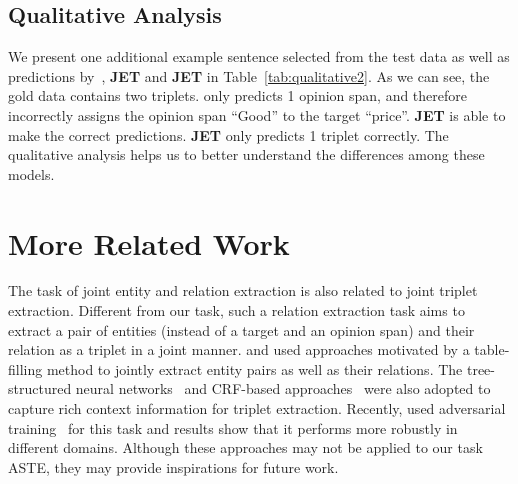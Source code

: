 \documentclass[11pt,a4paper]{article}
\begin{document}
\subsection{Qualitative Analysis}

We present one additional example sentence selected from the test data as well as predictions by~\citet{peng2019knowing}, \textbf{JET} and \textbf{JET} in Table~\ref{tab:qualitative2}.
As we can see, the gold data contains two triplets.
\citet{peng2019knowing} only predicts 1 opinion span, and therefore incorrectly assigns the opinion span ``Good'' to the target ``price''.
\textbf{JET} is able to make the correct predictions.
\textbf{JET} only predicts 1 triplet correctly.
The qualitative analysis helps us to better understand the differences among these models.

\section{More Related Work}
The task of joint entity and relation extraction is also related to joint triplet extraction.
Different from our task, such a relation extraction task aims to extract a pair of entities (instead of a target and an opinion span) and their relation as a triplet in a joint manner.
\citet{miwa-sasaki-2014-modeling} and \citet{li-ji-2014-incremental} used approaches motivated by a table-filling method to jointly extract entity pairs as well as their relations.
The tree-structured neural networks~\cite{miwa-bansal-2016-end} and CRF-based approaches~\cite{adel-schutze-2017-global} were also adopted to capture rich context information for triplet extraction.
Recently, \citet{bekoulis-etal-2018-adversarial} used adversarial training~\cite{goodfellow15} for this task and results show that it performs more robustly in different domains.
Although these approaches may not be applied to our task ASTE, they may provide inspirations for future work. 
\end{document}
